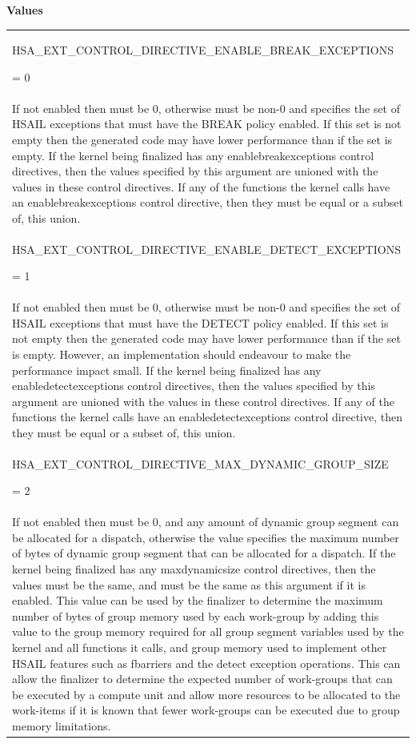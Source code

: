 \documentclass[final]{book}
\newcommand{\reftyp}[1]{#1}
\newcommand{\refenu}[1]{\reftyp{#1}}
\begin{document}
\noindent\textbf{Values}\\[-5mm]
\begin{longtable}{@{\hspace{2em}}p{\linewidth-2em}}
\hspace{-2em}\hypertarget{group__FinalizerCoreApi_1gga143d9e622dfd7889d52fb5eb5ed1ffdba1c209f3a9fd22b358006c221303f8893}{\refenu{HSA_EXT_CONTROL_DIRECTIVE_ENABLE_BREAK_EXCEPTIONS}} = 0\\If not enabled then must be 0, otherwise must be non-0 and specifies the set of HSAIL exceptions that must have the BREAK policy enabled. If this set is not empty then the generated code may have lower performance than if the set is empty. If the kernel being finalized has any enablebreakexceptions control directives, then the values specified by this argument are unioned with the values in these control directives. If any of the functions the kernel calls have an enablebreakexceptions control directive, then they must be equal or a subset of, this union.\\[2mm]
\hspace{-2em}\hypertarget{group__FinalizerCoreApi_1gga143d9e622dfd7889d52fb5eb5ed1ffdba5f6e061c9abd08976ee6f4c4ee48f30a}{\refenu{HSA_EXT_CONTROL_DIRECTIVE_ENABLE_DETECT_EXCEPTIONS}} = 1\\If not enabled then must be 0, otherwise must be non-0 and specifies the set of HSAIL exceptions that must have the DETECT policy enabled. If this set is not empty then the generated code may have lower performance than if the set is empty. However, an implementation should endeavour to make the performance impact small. If the kernel being finalized has any enabledetectexceptions control directives, then the values specified by this argument are unioned with the values in these control directives. If any of the functions the kernel calls have an enabledetectexceptions control directive, then they must be equal or a subset of, this union.\\[2mm]
\hspace{-2em}\hypertarget{group__FinalizerCoreApi_1gga143d9e622dfd7889d52fb5eb5ed1ffdba7787b99c887699ca6fe8d1cd4de3477e}{\refenu{HSA_EXT_CONTROL_DIRECTIVE_MAX_DYNAMIC_GROUP_SIZE}} = 2\\If not enabled then must be 0, and any amount of dynamic group segment can be allocated for a dispatch, otherwise the value specifies the maximum number of bytes of dynamic group segment that can be allocated for a dispatch. If the kernel being finalized has any maxdynamicsize control directives, then the values must be the same, and must be the same as this argument if it is enabled. This value can be used by the finalizer to determine the maximum number of bytes of group memory used by each work-group by adding this value to the group memory required for all group segment variables used by the kernel and all functions it calls, and group memory used to implement other HSAIL features such as fbarriers and the detect exception operations. This can allow the finalizer to determine the expected number of work-groups that can be executed by a compute unit and allow more resources to be allocated to the work-items if it is known that fewer work-groups can be executed due to group memory limitations.\\[2mm]

\end{longtable}
\end{document}
